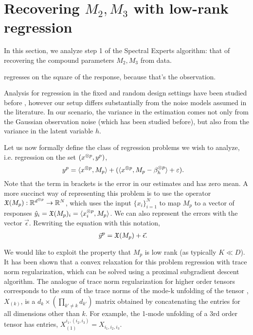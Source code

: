 \section{Recovering $M_2, M_3$ with low-rank regression}
\label{sec:regression}

In this section, we analyze step 1 of the Spectral Experts
algorithm: that of recovering the compound parameters $M_2,M_3$
from data.


\cite{candesPhaseLift} regresses on the square of the response,
because that's the observation.

Analysis for regression in the fixed and random design settings have
been studied before \citep{HsuKakadeZhang}, however our setup differs
substantially from the noise models assumed in the literature. In our
scenario, the variance in the estimation comes not only from the
Gaussian observation noise (which has been studied before), but also
from the variance in the latent variable $h$.

Let us now formally define the class of regression problems we wish to
analyze, i.e. regression on the set $(x^{\otimes p}, y^p)$,
\begin{align*}
  y^p &= \langle x^{\otimes p}, M_p \rangle + (\langle x^{\otimes p}, M_p - \beta_h^{\otimes p} \rangle + \varepsilon).
\end{align*}
Note that the term in brackets is the error in our estimates and has
zero mean.  A more succinct way of representing this problem is to use
the operator $\operatorname{\mathfrak{X}}(M_p) : \mathbb{R}^{d^{\otimes p}} \to \mathbb{R}^{N}$, which uses the
input $\{ x_i \}_{i=1}^{N}$ to map $M_p$ to a vector of responses $\hat
y_i = \operatorname{\mathfrak{X}}(M_p)_i = \langle x_i^{\otimes p}, M_p \rangle$. We can also represent the
errors with the vector $\vec \epsilon$. Rewriting the equation with this notation, 
\begin{align*}
  \vec y^p &= \operatorname{\mathfrak{X}}(M_p) + \vec \epsilon.
\end{align*}

 We would like to exploit
the property that $M_p$ is low rank (as typically $K \ll D$). It has
been shown that a convex relaxation for this problem regression with
trace norm regularization, which can be solved using a proximal
subgradient descent algorithm\citationneeded. The analogue of trace norm
regularization for higher order tensors corresponds to the sum of the
trace norms of the mode-k unfolding of the tensor \cite{Tomioka2011},
$X_{(k)}$, is a $d_k \times (\prod_{k' \neq k} d_{k'})$ matrix obtained
by concatenating the entries for all dimensions other than $k$. For
example, the 1-mode unfolding of a 3rd order tensor has entries,
$X_{(1)}^{i_1, (i_2, i_3)} = X_{i_1, i_2, i_3}$.

